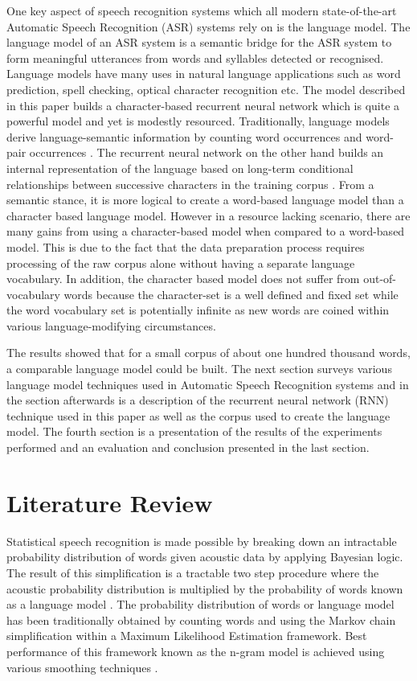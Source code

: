 \documentclass[a4paper]{article}
\begin{document}
One key aspect of speech recognition systems which all modern state-of-the-art Automatic Speech Recognition (ASR) systems rely on is the language model.  The language model of an ASR system is a semantic bridge for the ASR system to form meaningful utterances from words and syllables detected or recognised.  Language models have many uses in natural language applications such as word prediction, spell checking, optical character recognition etc.  The model described in this paper builds a character-based recurrent neural network which is quite a powerful model and yet is modestly resourced.  Traditionally, language models derive language-semantic information by counting word occurrences and word-pair occurrences \cite{allen1995natural,jelinek1976continuous}. The recurrent neural network on the other hand builds an internal representation of the language based on long-term conditional relationships between successive characters in the training corpus \cite{mikolov2011empirical}.   From a semantic stance, it is more logical to create a word-based language model than a character based language model.  However in a resource lacking scenario, there are many gains from using a character-based model when compared to a word-based model.  This is due to the fact that the data preparation process requires processing of the raw corpus alone without having a separate language vocabulary.  In addition, the character based model does not suffer from out-of-vocabulary words because the character-set is a well defined and fixed set while the word vocabulary set is potentially infinite as new words are coined within various language-modifying circumstances.

The results showed that for a small corpus of about one hundred thousand words, a comparable language model could be built. The next section surveys various language model techniques used in Automatic Speech Recognition systems and in the section afterwards is a description of the recurrent neural network (RNN) technique used in this paper as well as the corpus used to create the language model.  The fourth section is a presentation of the results of the experiments performed and an evaluation and conclusion presented in the last section.


\section{Literature Review}

Statistical speech recognition is made possible by breaking down an intractable probability distribution of words given acoustic data by applying Bayesian logic. The result of this simplification is a tractable two step procedure where the acoustic probability distribution is multiplied by the probability of words known as a language model \cite{gales2007}.  The probability distribution of words or language model has been traditionally obtained by counting words and using the Markov chain simplification within a Maximum Likelihood Estimation framework.  Best performance of this framework known as the n-gram model is achieved using various smoothing techniques \cite{chen1996empirical}.
\end{document}

